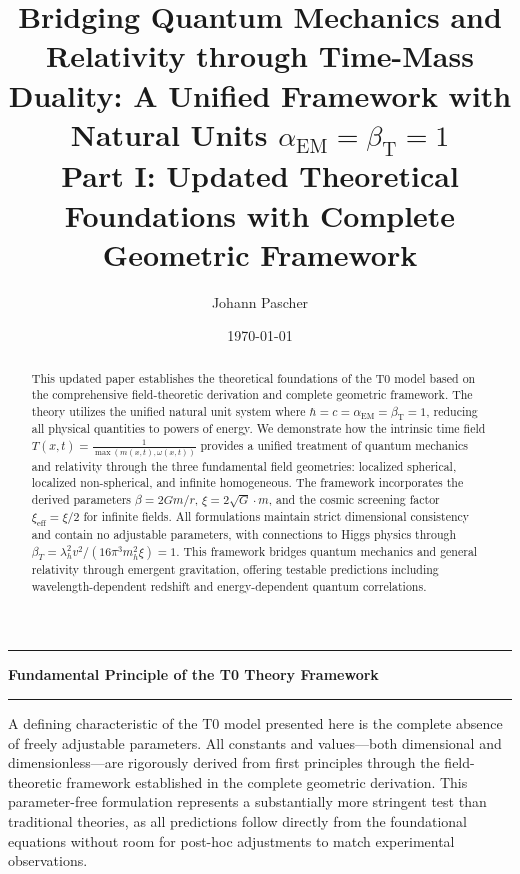\documentclass[twocolumn,aps,prl]{revtex4-2}
\newcommand{\Tfieldt}{T(x,t)}
\begin{document}
	
	\title{Bridging Quantum Mechanics and Relativity through Time-Mass Duality: A Unified Framework with Natural Units \(\alpha_{\text{EM}} = \beta_{\text{T}} = 1\) \\ Part I: Updated Theoretical Foundations with Complete Geometric Framework}
	\author{Johann Pascher}
	\date{\today}
	
	\begin{abstract}
		This updated paper establishes the theoretical foundations of the T0 model based on the comprehensive field-theoretic derivation and complete geometric framework. The theory utilizes the unified natural unit system where \(\hbar = c = \alpha_{\text{EM}} = \beta_{\text{T}} = 1\), reducing all physical quantities to powers of energy. We demonstrate how the intrinsic time field \(\Tfieldt = \frac{1}{\max(m(x,t), \omega(x,t))}\) provides a unified treatment of quantum mechanics and relativity through the three fundamental field geometries: localized spherical, localized non-spherical, and infinite homogeneous. The framework incorporates the derived parameters \(\beta = 2Gm/r\), \(\xi = 2\sqrt{G} \cdot m\), and the cosmic screening factor \(\xi_{\text{eff}} = \xi/2\) for infinite fields. All formulations maintain strict dimensional consistency and contain no adjustable parameters, with connections to Higgs physics through \(\beta_T = \lambda_h^2 v^2/(16\pi^3 m_h^2 \xi) = 1\). This framework bridges quantum mechanics and general relativity through emergent gravitation, offering testable predictions including wavelength-dependent redshift and energy-dependent quantum correlations.
	\end{abstract}
	
	\maketitle
	
	\begin{center}
		\rule{\linewidth}{0.5pt}
		{\bfseries\large Fundamental Principle of the T0 Theory Framework}
		\rule{\linewidth}{0.5pt}
	\end{center}
	
	A defining characteristic of the T0 model presented here is the complete absence of freely adjustable parameters. All constants and values—both dimensional and dimensionless—are rigorously derived from first principles through the field-theoretic framework established in the complete geometric derivation. This parameter-free formulation represents a substantially more stringent test than traditional theories, as all predictions follow directly from the foundational equations without room for post-hoc adjustments to match experimental observations.
	
\end{document}

